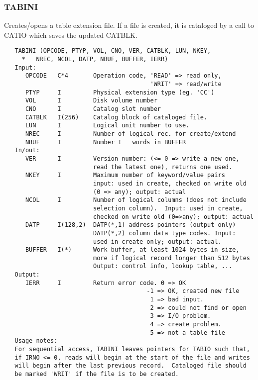 \subsubsection{TABINI}
Creates/opens a table extension file.  If a file is created,
it is cataloged by a call to CATIO which saves the updated CATBLK.
\begin{verbatim}
   TABINI (OPCODE, PTYP, VOL, CNO, VER, CATBLK, LUN, NKEY,
     *   NREC, NCOL, DATP, NBUF, BUFFER, IERR)
   Input:
      OPCODE   C*4       Operation code, 'READ' => read only,
                                         'WRIT' => read/write
      PTYP     I         Physical extension type (eg. 'CC')
      VOL      I         Disk volume number
      CNO      I         Catalog slot number
      CATBLK   I(256)    Catalog block of cataloged file.
      LUN      I         Logical unit number to use.
      NREC     I         Number of logical rec. for create/extend
      NBUF     I         Number I   words in BUFFER
   In/out:
      VER      I         Version number: (<= 0 => write a new one,
                         read the latest one), returns one used.
      NKEY     I         Maximum number of keyword/value pairs
                         input: used in create, checked on write old
                         (0 => any); output: actual
      NCOL     I         Number of logical columns (does not include
                         selection column).  Input: used in create,
                         checked on write old (0=>any); output: actual
      DATP     I(128,2)  DATP(*,1) address pointers (output only)
                         DATP(*,2) column data type codes. Input:
                         used in create only; output: actual.
      BUFFER   I(*)      Work buffer, at least 1024 bytes in size,
                         more if logical record longer than 512 bytes
                         Output: control info, lookup table, ...
   Output:
      IERR     I         Return error code. 0 => OK
                                        -1 => OK, created new file
                                         1 => bad input.
                                         2 => could not find or open
                                         3 => I/O problem.
                                         4 => create problem.
                                         5 => not a table file
   Usage notes:
   For sequential access, TABINI leaves pointers for TABIO such that,
   if IRNO <= 0, reads will begin at the start of the file and writes
   will begin after the last previous record.  Cataloged file should
   be marked 'WRIT' if the file is to be created.

\end{verbatim}


